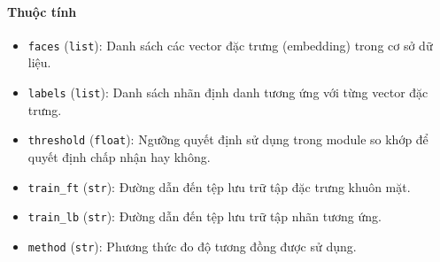 \paragraph{Thuộc tính}
\begin{itemize}
    \item \texttt{faces} (\texttt{list}): Danh sách các vector đặc trưng (embedding) trong cơ sở dữ liệu.
    \item \texttt{labels} (\texttt{list}): Danh sách nhãn định danh tương ứng với từng vector đặc trưng.

    \item \texttt{threshold} (\texttt{float}): Ngưỡng quyết định sử dụng trong module so khớp để quyết định chấp nhận hay không.
    
    \item \texttt{train\_ft} (\texttt{str}): Đường dẫn đến tệp lưu trữ tập đặc trưng khuôn mặt.
    
    \item \texttt{train\_lb} (\texttt{str}): Đường dẫn đến tệp lưu trữ tập nhãn tương ứng.
    
    \item \texttt{method} (\texttt{str}): Phương thức đo độ tương đồng được sử dụng.
\end{itemize}
